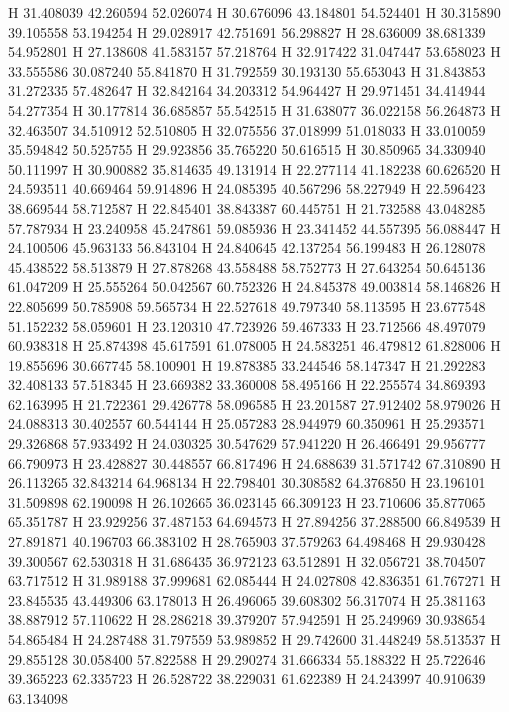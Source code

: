 \documentclass{article}
\begin{document}
H 31.408039 42.260594 52.026074
H 30.676096 43.184801 54.524401
H 30.315890 39.105558 53.194254
H 29.028917 42.751691 56.298827
H 28.636009 38.681339 54.952801
H 27.138608 41.583157 57.218764
H 32.917422 31.047447 53.658023
H 33.555586 30.087240 55.841870
H 31.792559 30.193130 55.653043
H 31.843853 31.272335 57.482647
H 32.842164 34.203312 54.964427
H 29.971451 34.414944 54.277354
H 30.177814 36.685857 55.542515
H 31.638077 36.022158 56.264873
H 32.463507 34.510912 52.510805
H 32.075556 37.018999 51.018033
H 33.010059 35.594842 50.525755
H 29.923856 35.765220 50.616515
H 30.850965 34.330940 50.111997
H 30.900882 35.814635 49.131914
H 22.277114 41.182238 60.626520
H 24.593511 40.669464 59.914896
H 24.085395 40.567296 58.227949
H 22.596423 38.669544 58.712587
H 22.845401 38.843387 60.445751
H 21.732588 43.048285 57.787934
H 23.240958 45.247861 59.085936
H 23.341452 44.557395 56.088447
H 24.100506 45.963133 56.843104
H 24.840645 42.137254 56.199483
H 26.128078 45.438522 58.513879
H 27.878268 43.558488 58.752773
H 27.643254 50.645136 61.047209
H 25.555264 50.042567 60.752326
H 24.845378 49.003814 58.146826
H 22.805699 50.785908 59.565734
H 22.527618 49.797340 58.113595
H 23.677548 51.152232 58.059601
H 23.120310 47.723926 59.467333
H 23.712566 48.497079 60.938318
H 25.874398 45.617591 61.078005
H 24.583251 46.479812 61.828006
H 19.855696 30.667745 58.100901
H 19.878385 33.244546 58.147347
H 21.292283 32.408133 57.518345
H 23.669382 33.360008 58.495166
H 22.255574 34.869393 62.163995
H 21.722361 29.426778 58.096585
H 23.201587 27.912402 58.979026
H 24.088313 30.402557 60.544144
H 25.057283 28.944979 60.350961
H 25.293571 29.326868 57.933492
H 24.030325 30.547629 57.941220
H 26.466491 29.956777 66.790973
H 23.428827 30.448557 66.817496
H 24.688639 31.571742 67.310890
H 26.113265 32.843214 64.968134
H 22.798401 30.308582 64.376850
H 23.196101 31.509898 62.190098
H 26.102665 36.023145 66.309123
H 23.710606 35.877065 65.351787
H 23.929256 37.487153 64.694573
H 27.894256 37.288500 66.849539
H 27.891871 40.196703 66.383102
H 28.765903 37.579263 64.498468
H 29.930428 39.300567 62.530318
H 31.686435 36.972123 63.512891
H 32.056721 38.704507 63.717512
H 31.989188 37.999681 62.085444
H 24.027808 42.836351 61.767271
H 23.845535 43.449306 63.178013
H 26.496065 39.608302 56.317074
H 25.381163 38.887912 57.110622
H 28.286218 39.379207 57.942591
H 25.249969 30.938654 54.865484
H 24.287488 31.797559 53.989852
H 29.742600 31.448249 58.513537
H 29.855128 30.058400 57.822588
H 29.290274 31.666334 55.188322
H 25.722646 39.365223 62.335723
H 26.528722 38.229031 61.622389
H 24.243997 40.910639 63.134098
\end{document}
